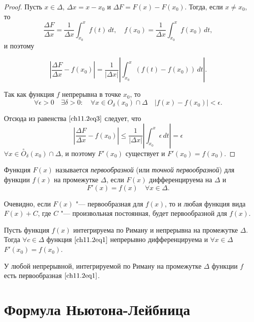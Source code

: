 \begin{proof}
Пусть $x \in \Delta$, $\Delta x = x - x_0$ и $\Delta F = F(x) - F(x_0)$. Тогда, если $x \not= x_0$, то 
$$ 
\frac{\Delta F}{\Delta x} = \frac{1}{\Delta x} \int_{x_0}^{x} f(t) \,dt, \quad f(x_0) = \frac{1}{\Delta x} \int_{x_0}^{x} f(x_0) \,dt,
$$
и поэтому 

\begin{equation} \label{ch11.2eq3}
\left| \frac{\Delta F}{\Delta x} - f(x_0) \right| = \frac{1}{|\Delta x|} \left| \int_{x_0}^{x} \left( f(t) - f(x_0) \right) \,dt \right|.
\end{equation}

Так как функция $f$ непрерывна в точке $x_0$, то
$$
\forall \epsilon > 0 \quad \exists \delta > 0 : \quad \forall x \in O_\delta(x_0) \cap \Delta \quad |f(x) - f(x_0)| < \epsilon.
$$

Отсюда из равенства $\eqref{ch11.2eq3}$ следует, что 
$$
\left| \frac{\Delta F}{\Delta x} - f(x_0) \right| \le \frac{1}{|\Delta x|} \left| \int_{x_0}^{x} \epsilon \,dt\right| = \epsilon
$$
$\forall x \in \overset{\circ}{O}_\delta(x_0) \cap \Delta$, и поэтому $F'(x_0)$  существует и $F'(x_0) = f(x_0).$
\end{proof}

\begin{defn}
Функция $F(x)$ называется \textit{первообразной} (или \textit{точной первообразной}) для функции $f(x)$ на промежутке  $\Delta$, если $F(x)$ дифференцируема на $\Delta$ и
$$
F'(x) = f(x) \quad \forall x \in \Delta.
$$

Очевидно, если $F(x)$ "--- первообразная для $f(x)$, то и любая функция вида $F(x) + C$,  где $C$ "--- произвольная постоянная, будет первообразной для $f(x)$. 
\end{defn}

\begin{cons}
Пусть функция $f(x)$ интегрируема по Риману и непрерывна на промежутке $\Delta$. Тогда $\forall c \in \Delta$ функция $\eqref{ch11.2eq1}$ непрерывно дифференцируема и $\forall x \in \Delta$ $F'(x_0) = f(x_0)$. 
\end{cons}
У  любой непрерывной, интегрируемой по Риману на промежутке $\Delta$ функции $f$ есть первообразная $\eqref{ch11.2eq1}$.

\section[Формула Ньютона"--~Лейбница]{Формула Ньютона-Лейбница}


